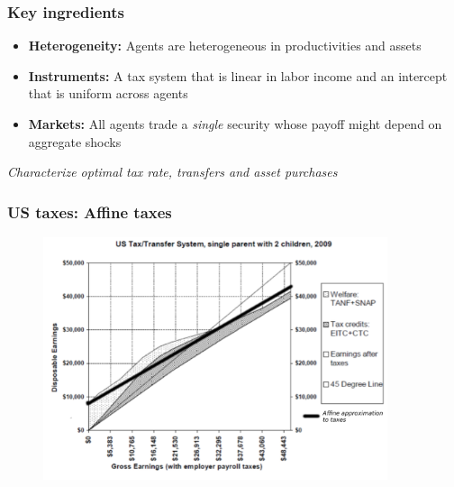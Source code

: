 \documentclass{beamer}
\begin{document}
\begin{frame}
\frametitle{Key ingredients}

\begin{itemize}
\vspace{2mm}
 \item \textbf{Heterogeneity:} Agents are heterogeneous in productivities and assets 
 \item \textbf{Instruments:} A tax system that is linear in labor income and an intercept that is uniform across agents
 \vspace{2mm}
 \item \textbf{Markets:}  All agents trade a \emph{single} security whose payoff might depend on aggregate shocks
\end{itemize}

\emph{Characterize optimal tax rate, transfers and asset purchases}

\end{frame}

\begin{frame}
\frametitle{US taxes: Affine taxes}
{
  \begin{figure}
    \centering
    \includegraphics[width = 0.9\textwidth]{affine_taxes.pdf}
  \end{figure}

}
\end{frame}
\end{document}
